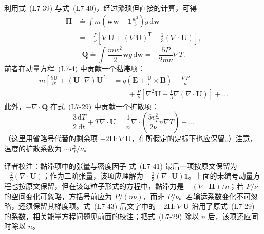 利用式~(L7-39) 与式~(L7-40)，经过繁琐但直接的计算，可得
\begin{equation}
\begin{aligned}
\boldsymbol\Pi
&\doteq\int m\left(\boldsymbol w\boldsymbol w-\boldsymbol1\frac{w^2}{3}\right)
 \widetilde g\,\mathrm d\boldsymbol w\\
&=-\frac P\nu\left[\nabla\boldsymbol U+(\nabla\boldsymbol U)^{\mathsf T}
 -\frac23(\nabla\cdot\boldsymbol U)\right],
\end{aligned}\tag{L7-41}\label{eq:L7:41}
\end{equation}
\begin{equation}
\boldsymbol Q\doteq\int\frac{mw^2}{2}\boldsymbol w\widetilde g\,\mathrm d\boldsymbol w
=-\frac{5P}{2m\nu}\nabla T.
\tag{L7-42}\label{eq:L7:42}
\end{equation}
前者在动量方程~(L7-4) 中贡献一个黏滞项：
\begin{equation*}
\begin{aligned}
m\left[\frac{\partial\boldsymbol U}{\partial t}
 +(\boldsymbol U\cdot\nabla)\boldsymbol U\right]
&=q\left(\boldsymbol E+\frac{\boldsymbol U}c\times\boldsymbol B\right)-\frac{\nabla P}{n}\\
&\qquad+\frac P\nu\left[\nabla^2\boldsymbol U
 +\frac13\nabla(\nabla\cdot\boldsymbol U)\right]+\ldots
\end{aligned}
\end{equation*}
此外，$-\nabla\cdot\boldsymbol Q$ 在式~(L7-29) 中贡献一个扩散项：
\begin{equation}
\frac32\frac{\mathrm dT}{\mathrm dt}+T\nabla\cdot\boldsymbol U
=\frac1n\nabla\cdot\left(\frac{5v_T^2}{2\nu}n\nabla T\right)+\ldots
\tag{L7-43}\label{eq:L7:43}
\end{equation}
（这里用省略号代替的剩余项 $-2\boldsymbol\Pi:\nabla\boldsymbol U$，在所假定的定标下也应保留。）注意，温度的扩散系数为 $\sim v_T^2/\nu$。
\begin{correction}{译者校注：黏滞项中的张量与密度因子}
式~(L7-41) 最后一项按原文保留为 $-\tfrac23(\nabla\cdot\boldsymbol U)$；作为二阶张量，该项应理解为 $-\tfrac23(\nabla\cdot\boldsymbol U)\boldsymbol1$。上面的未编号动量方程也按原文保留，但在该每粒子形式的方程中，黏滞力是 $-(\nabla\cdot\boldsymbol\Pi)/n$；若 $P/\nu$ 的空间变化可忽略，方括号前应为 $P/(n\nu)$，而非 $P/\nu$。若输运系数变化不可忽略，还须保留其梯度项。式~(L7-43) 后文字中的 $-2\boldsymbol\Pi:\nabla\boldsymbol U$ 沿用了原式~(L7-29) 的系数，相关能量方程问题见前面的校注；把式~(L7-29) 除以 $n$ 后，该项还应同时除以 $n$。
\end{correction}

